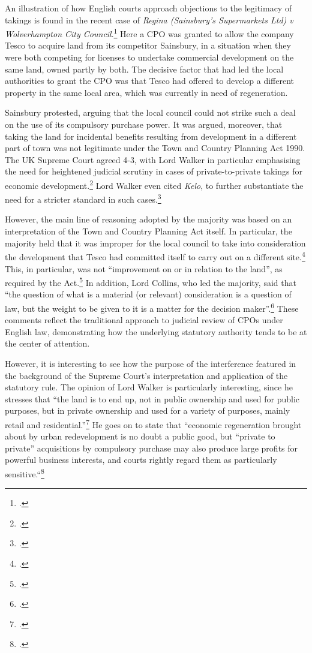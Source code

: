 An illustration of how English courts approach objections to the legitimacy of takings is found in the recent case of {\it Regina (Sainsbury’s Supermarkets Ltd) v Wolverhampton City Council}.\footcite{sainsbury10} Here a CPO was granted to allow the company Tesco to acquire land from its competitor Sainsbury, in a situation when they were both competing for licenses to undertake commercial development on the same land, owned partly by both. 
The decisive factor that had led the local authorities to grant the CPO was that Tesco had offered to develop a different property in the same local area, which was currently in need of regeneration.

Sainsbury protested, arguing that the local council could not strike such a deal on the use of its compulsory purchase power. It was argued, moreover, that taking the land for incidental benefits resulting from development in a different part of town was not legitimate under the Town and Country Planning Act 1990. The UK Supreme Court agreed 4-3, with Lord Walker in particular emphasising the need for heightened judicial scrutiny in cases of private-to-private takings for economic development.\footcite[80-84]{sainsbury10} Lord Walker even cited {\it Kelo}, to further substantiate the need for a stricter standard in such cases.\footcite[81]{sainsbury10} 

However, the main line of reasoning adopted by the majority was based on an interpretation of the Town and Country Planning Act itself. In particular, the majority held that it was improper for the local council to take into consideration the development that Tesco had committed itself to carry out on a different site.\footcite[73-79]{sainsbury10} This, in particular, was not ``improvement on or in relation to the land'', as required by the Act.\footcite[336]{tcpa90} In addition, Lord Collins, who led the majority, said that ``the question of what is a material (or relevant) consideration is a question of law, but the weight to be given to it is a matter for the decision maker''.\footcite[70]{sainsbury10} These comments reflect the traditional approach to judicial review of CPOs under English law, demonstrating how the underlying statutory authority tends to be at the center of attention.

However, it is interesting to see how the purpose of the interference featured in the background of the Supreme Court's interpretation and application of the statutory rule. The opinion of Lord Walker is particularly interesting, since he stresses that ``the land is to end up, not in public ownership and used for public purposes, but in private ownership and used for a variety of purposes, mainly retail and residential.''\footcite[81]{sainsbury10} He goes on to state that ``economic regeneration brought about by urban redevelopment is no doubt a public good, but ``private to private'' acquisitions by compulsory purchase may also produce large profits for powerful business interests, and courts rightly regard them as particularly sensitive.``\footcite[81]{sainsbury10}

